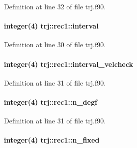 Definition at line 32 of file trj.\-f90.

\hypertarget{structtrj_1_1rec1_ae49a5622a7b1b8315421e211b128c6d2}{
\paragraph[{interval}]{\setlength{\rightskip}{0pt plus 5cm}integer(4) trj\-::rec1\-::interval\hspace{0.3cm}{\ttfamily [private]}}}\label{structtrj_1_1rec1_ae49a5622a7b1b8315421e211b128c6d2}


Definition at line 30 of file trj.\-f90.

\hypertarget{structtrj_1_1rec1_a7a30d4fb88f3441a72b45078915babe9}{
\paragraph[{interval\-\_\-velcheck}]{\setlength{\rightskip}{0pt plus 5cm}integer(4) trj\-::rec1\-::interval\-\_\-velcheck\hspace{0.3cm}{\ttfamily [private]}}}\label{structtrj_1_1rec1_a7a30d4fb88f3441a72b45078915babe9}


Definition at line 31 of file trj.\-f90.

\hypertarget{structtrj_1_1rec1_a51d2fd394bb6ad4aa5a9284f13f11353}{
\paragraph[{n\-\_\-degf}]{\setlength{\rightskip}{0pt plus 5cm}integer(4) trj\-::rec1\-::n\-\_\-degf\hspace{0.3cm}{\ttfamily [private]}}}\label{structtrj_1_1rec1_a51d2fd394bb6ad4aa5a9284f13f11353}


Definition at line 31 of file trj.\-f90.

\hypertarget{structtrj_1_1rec1_ac4b10b0318da6a7f407818b9210ec1e6}{
\paragraph[{n\-\_\-fixed}]{\setlength{\rightskip}{0pt plus 5cm}integer(4) trj\-::rec1\-::n\-\_\-fixed\hspace{0.3cm}{\ttfamily [private]}}}\label{structtrj_1_1rec1_ac4b10b0318da6a7f407818b9210ec1e6}


